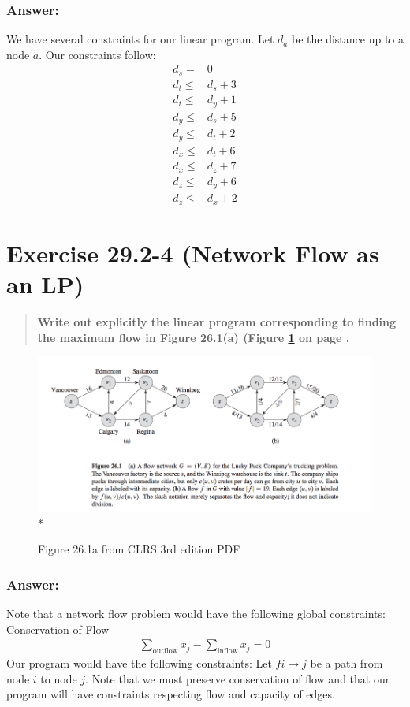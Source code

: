 \documentclass[titlepage]{article}\usepackage[]{graphicx}\usepackage[]{color}
\begin{document}
  \subsubsection{Answer:}
  We have several constraints for our linear program. Let $d_a$ be the
  distance up to a node $a$. Our constraints follow:
  \begin{align*}
    d_s = & 0 \\
    d_t \leq & d_s + 3 \\
    d_t \leq & d_y + 1 \\
    d_y \leq & d_s + 5 \\
    d_y \leq & d_t + 2 \\
    d_x \leq & d_t + 6 \\
    d_x \leq & d_z + 7 \\
    d_z \leq & d_y + 6 \\
    d_z \leq & d_x + 2 
  \end{align*}
\section{Exercise 29.2-4 (Network Flow as an LP)}
  \begin{quote}
    \textbf{Write out explicitly the linear program corresponding to finding
      the maximum flow in Figure 26.1(a) (Figure \ref{fig:26a} on page
      \pageref{fig:26a}.}
  \end{quote}
  \begin{figure}
    \begin{center}
    \includegraphics[scale=0.40]{26.1a.png}\\*
    \end{center}
    \caption{Figure 26.1a from CLRS 3rd edition PDF}
    \label{fig:26a}
  \end{figure}
  \subsubsection{Answer:}
  Note that a network flow problem would have the following global constraints:
  Conservation of Flow
  \begin{align}
    \sum_{\text{outflow}} x_j - \sum_{\text{inflow}}x_j = 0
  \end{align}
  Our program would have the following constraints:
  Let $f{i \to j} $ be a path from node $i$ to node $j$. Note that we must
  preserve conservation of flow and that our program will have constraints
  respecting flow and capacity of edges.
\end{document}
